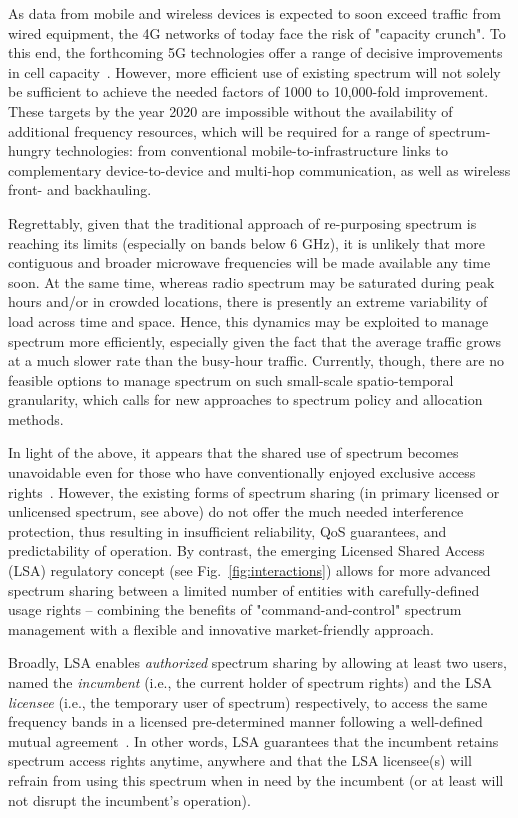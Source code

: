 \documentclass[journal]{IEEEtran}
\begin{document}
As data from mobile and wireless devices is expected to soon exceed traffic from wired equipment, the 4G networks of today face the risk of "capacity crunch". To this end, the forthcoming 5G technologies offer a range of decisive improvements in cell capacity~\cite{And14}. However, more efficient use of existing spectrum will not solely be sufficient to achieve the needed factors of 1000 to 10,000-fold improvement. These targets by the year 2020 are impossible without the availability of additional frequency resources, which will be required for a range of spectrum-hungry technologies: from conventional mobile-to-infrastructure links to complementary device-to-device and multi-hop communication, as well as wireless front- and backhauling.

Regrettably, given that the traditional approach of re-purposing spectrum is reaching its limits (especially on bands below 6 GHz), it is unlikely that more contiguous and broader microwave frequencies will be made available any time soon. At the same time, whereas radio spectrum may be saturated during peak hours and/or in crowded locations, there is presently an extreme variability of load across time and space. Hence, this dynamics may be exploited to manage spectrum more efficiently, especially given the fact that the average traffic grows at a much slower rate than the busy-hour traffic. Currently, though, there are no feasible options to manage spectrum on such small-scale spatio-temporal granularity, which calls for new approaches to spectrum policy and allocation methods.

In light of the above, it appears that the shared use of spectrum becomes unavoidable even for those who have conventionally enjoyed exclusive access rights~\cite{Cha15}. However, the existing forms of spectrum sharing (in primary licensed or unlicensed spectrum, see above) do not offer the much needed interference protection, thus resulting in insufficient reliability, QoS guarantees, and predictability of operation. By contrast, the emerging Licensed Shared Access (LSA) regulatory concept (see Fig.~\ref{fig:interactions}) allows for more advanced spectrum sharing between a limited number of entities with carefully-defined usage rights -- combining the benefits of "command-and-control" spectrum management with a flexible and innovative market-friendly approach. 

Broadly, LSA enables \textit{authorized} spectrum sharing by allowing at least two users, named the \textit{incumbent} (i.e., the current holder of spectrum rights) and the LSA \textit{licensee} (i.e., the temporary user of spectrum) respectively, to access the same frequency bands in a licensed pre-determined manner following a well-defined mutual agreement~\cite{Buc14}. In other words, LSA guarantees that the incumbent retains spectrum access rights anytime, anywhere and that the LSA licensee(s) will refrain from using this spectrum when in need by the incumbent (or at least will not disrupt the incumbent's operation).
\end{document}
